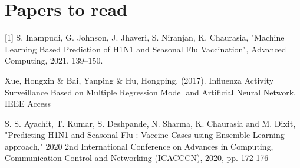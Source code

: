 \documentclass[10pt,twoside]{article}
\begin{document}
\section{Papers to read}
[1] S. Inampudi, G. Johnson, J. Jhaveri, S. Niranjan, K. Chaurasia, "Machine Learning Based Prediction of H1N1 and Seasonal Flu Vaccination", Advanced Computing, 2021. 139–150.

\noindent [2] Xue, Hongxin \& Bai, Yanping \& Hu, Hongping.
(2017). Influenza Activity Surveillance Based on Multiple
Regression Model and Artificial Neural Network. IEEE Access

\noindent [3] S. S. Ayachit, T. Kumar, S. Deshpande, N. Sharma, K. Chaurasia and M. Dixit, "Predicting H1N1 and Seasonal Flu : Vaccine Cases using Ensemble Learning approach," 2020 2nd International Conference on Advances in Computing, Communication Control and Networking (ICACCCN), 2020, pp. 172-176
\end{document}
